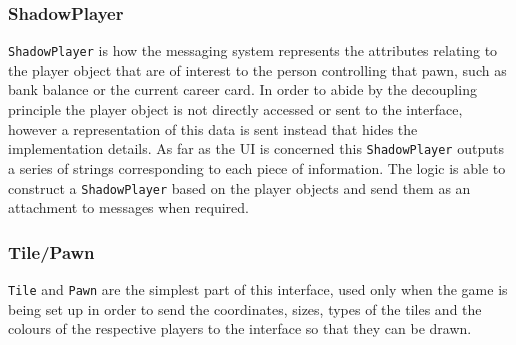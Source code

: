 \documentclass[a4paper, 11pt]{article}
\begin{document}
	\subsubsection*{ShadowPlayer}
	\texttt{ShadowPlayer} is how the messaging system represents the attributes relating to the player object that are of interest to the person controlling that pawn, such as bank balance or the current career card.
	In order to abide by the decoupling principle the player object is not directly accessed or sent to the interface, however a representation of this data is sent instead that hides the implementation details.
	As far as the UI is concerned this \texttt{ShadowPlayer} outputs a series of strings corresponding to each piece of information.
	The logic is able to construct a \texttt{ShadowPlayer} based on the player objects and send them as an attachment to messages when required.
	\subsubsection*{Tile/Pawn}
	\texttt{Tile} and \texttt{Pawn} are the simplest part of this interface, used only when the game is being set up in order to send the coordinates, sizes, types of the tiles and the colours of the respective players to the interface so that they can be drawn.
	
\end{document}

